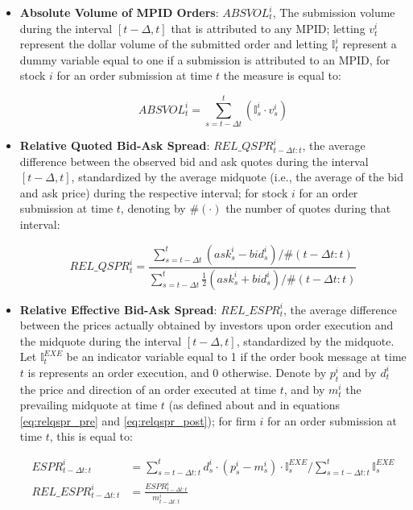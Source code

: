 \documentclass{article}
\begin{document}
\begin{itemize}
\item \textbf{Absolute Volume of MPID Orders}: $ABSVOL_{t}^i$, The submission volume during the interval $[t-\Delta,t]$ that is attributed to any MPID; letting $v_t^i$ represent the dollar volume of the submitted order and letting $\mathbb{I}_t^i$ represent a dummy variable equal to one if a submission is attributed to an MPID, for stock $i$ for an order submission at time $t$ the measure is equal to:

    \begin{equation*}\label{eq:relnum_pre}
    ABSVOL_{t}^i = \sum_{s=t-\Delta t}^t (\mathbb{I}_s^i \cdot v_s^i)
    \end{equation*}

\item \textbf{Relative Quoted Bid-Ask Spread}: $REL\_QSPR_{t-\Delta t:t}^i$, the average difference between the observed bid and ask quotes during the interval $[t-\Delta,t]$, standardized by the average midquote (i.e., the average of the bid and ask price) during the respective interval; for stock $i$ for an order submission at time $t$, denoting by $\#( \cdot)$ the number of quotes during that interval:

    \begin{equation}\label{eq:relqspr_pre}
    REL\_QSPR_{t}^i = \frac{\sum _{s=t-\Delta t} ^{t} (ask_s^i - bid_s^i) / \#(t-\Delta t:t)}{\sum _{s=t-\Delta t} ^{t} \frac{1}{2}(ask_s^i + bid_s^i) / \#(t-\Delta t:t)}
    \end{equation}

\item \textbf{Relative Effective Bid-Ask Spread}: $REL\_ESPR_{t}^i$, the average difference between the prices actually obtained by investors upon order execution and the midquote during the interval $[t-\Delta,t]$, standardized by the midquote. Let $\mathbb{I}_{t}^{EXE}$ be an indicator variable equal to 1 if the order book message at time $t$ is represents an order execution, and 0 otherwise. Denote by $p_t^i$ and by $d_t^i$ the price and direction of an order executed at time $t$, and by $m_t^i$ the prevailing midquote at time $t$ (as defined about and in equations \ref{eq:relqspr_pre} and \ref{eq:relqspr_post}); for firm $i$ for an order submission at time $t$, this is equal to:

    \begin{align}\label{eq:espr_pre}
    ESPR_{t-\Delta t:t}^i &= \sum _{s=t-\Delta t:t} ^{t} d_s^i\cdot (p_s^i - m_s^i)\cdot \mathbb{I}_{s}^{EXE} / \sum _{s=t-\Delta t:t} ^{t} \mathbb{I}_{s}^{EXE} \\
    REL\_ESPR_{t-\Delta t:t}^i &= \frac{ESPR_{t-\Delta t:t}^i}{m_{t-\Delta t:t}^i}
    \end{align}


\end{itemize}
\end{document}
